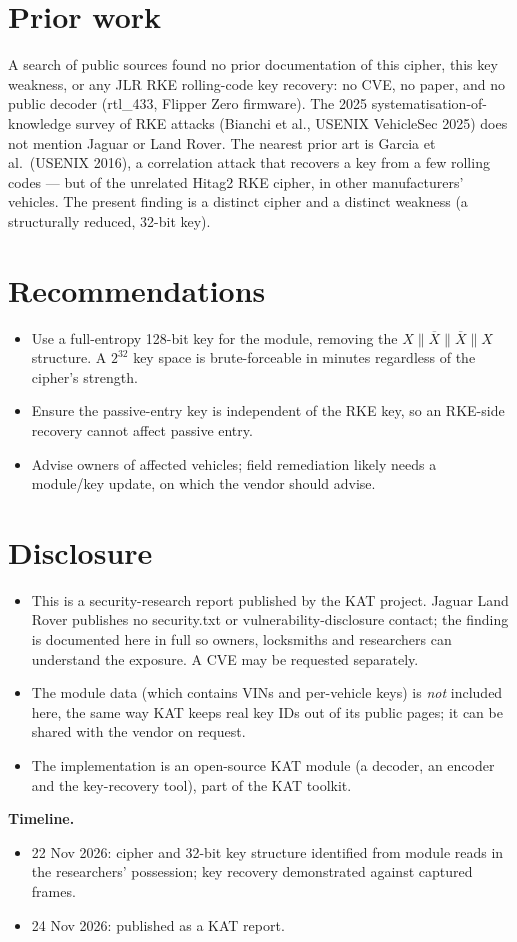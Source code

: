 \documentclass[11pt,a4paper]{article}
\begin{document}
\section{Prior work}
A search of public sources found no prior documentation of this cipher, this key weakness, or any JLR RKE rolling-code key recovery: no CVE, no paper, and no public decoder (rtl\_433, Flipper Zero firmware). The 2025 systematisation-of-knowledge survey of RKE attacks (Bianchi et al., USENIX VehicleSec 2025) does not mention Jaguar or Land Rover. The nearest prior art is Garcia et al.\ (USENIX 2016), a correlation attack that recovers a key from a few rolling codes --- but of the unrelated Hitag2 RKE cipher, in other manufacturers' vehicles. The present finding is a distinct cipher and a distinct weakness (a structurally reduced, 32-bit key).

\section{Recommendations}
\begin{itemize}
\item Use a full-entropy 128-bit key for the module, removing the $X\|\overline{X}\|\overline{X}\|X$ structure. A $2^{32}$ key space is brute-forceable in minutes regardless of the cipher's strength.
\item Ensure the passive-entry key is independent of the RKE key, so an RKE-side recovery cannot affect passive entry.
\item Advise owners of affected vehicles; field remediation likely needs a module/key update, on which the vendor should advise.
\end{itemize}

\section{Disclosure}
\begin{itemize}
\item This is a security-research report published by the KAT project. Jaguar Land Rover publishes no security.txt or vulnerability-disclosure contact; the finding is documented here in full so owners, locksmiths and researchers can understand the exposure. A CVE may be requested separately.
\item The module data (which contains VINs and per-vehicle keys) is \emph{not} included here, the same way KAT keeps real key IDs out of its public pages; it can be shared with the vendor on request.
\item The implementation is an open-source KAT module (a decoder, an encoder and the key-recovery tool), part of the KAT toolkit.
\end{itemize}

\noindent\textbf{Timeline.}
\begin{itemize}
\item 22 Nov 2026: cipher and 32-bit key structure identified from module reads in the researchers' possession; key recovery demonstrated against captured frames.
\item 24 Nov 2026: published as a KAT report.
\end{itemize}
\end{document}
